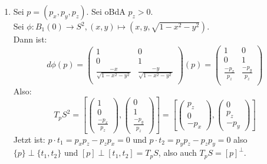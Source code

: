\begin{solution}
\begin{enumerate}[label= (\alph*)]
    \item Sei \( p = (p_x, p_y, p_z) \). Sei oBdA \( p_z > 0 \). \\
    Sei \( \phi : B_1(0) \to S^2, (x,y) \mapsto (x,y,\sqrt{ 1- x^2-y^2}) \). \\
    Dann ist:
    \begin{equation*} 
      d \phi(p) = 
      \begin{pmatrix}
        1 & 0 \\
        0 & 1 \\
        \frac{-x}{\sqrt{ 1 - x^2 -y^2}} & \frac{-y}{\sqrt{ 1 - x^2 -y^2}} \\
      \end{pmatrix}(p) = 
      \begin{pmatrix}
        1 & 0 \\
        0 & 1 \\
        \frac{-p_x}{p_z} & \frac{-p_y}{p_z} \\
      \end{pmatrix} 
    \end{equation*}
    Also:
    \begin{equation*}
      {T_p S}^2 = \left[
      \begin{pmatrix}
        1 \\
        0 \\
        \frac{-p_x}{p_z}
      \end{pmatrix},
      \begin{pmatrix}
        0 \\
        1 \\
        \frac{-p_y}{p_z}
      \end{pmatrix}
      \right] = \left[
      \begin{pmatrix}
        p_z\\
        0 \\
        -p_x
      \end{pmatrix},
      \begin{pmatrix}
        0 \\
        p_z \\
        -p_y
      \end{pmatrix}
      \right]
    \end{equation*}
    Jetzt ist: \( p \cdot t_1 = p_x p_z - p_z p_x = 0 \) und \( p \cdot t_2 = p_y p_z - p_z p_y = 0 \) also \\
    \( \{ p \} \perp \{ t_1,t_2 \} \) und \( [p] \perp [t_1,t_2] = T_p S \), also auch \( T_p S = {[p]}^{\perp} \).
  \end{enumerate}
\end{solution}

